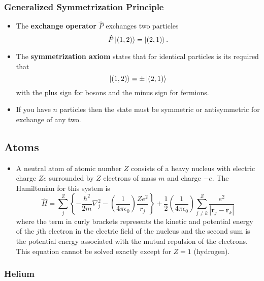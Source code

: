 \documentclass{article}
\renewcommand{\vec}[1]{\boldsymbol{\mathbf{#1}}}
\begin{document}
\subsubsection{Generalized Symmetrization Principle}

\begin{itemize}
  \item The \textbf{exchange operator} $\hat{P}$ exchanges two particles \[\hat{P} \ket{(1, 2)} = \ket{(2, 1)}.\]

  \item The \textbf{symmetrization axiom} states that for identical particles is its required that \[\ket{(1, 2)} = \pm \ket{(2, 1)}\] with the plus sign for bosons and the minus sign for fermions.

  \item If you have $n$ particles then the state must be symmetric or antisymmetric for exchange of any two.
\end{itemize}

\subsection{Atoms}

\begin{itemize}
  \item A neutral atom of atomic number $Z$ consists of a heavy nucleus with electric charge $Z e$ surrounded by $Z$ electrons of mass $m$ and charge $-e$. The Hamiltonian for this system is \[\hat{H} = \sum_j^Z \left\{ -\frac{\hbar^2}{2 m} \nabla_j^2 - \left( \frac{1}{4 \pi \epsilon_0} \right) \frac{Z e^2}{r_j} \right\} + \frac{1}{2} \left( \frac{1}{4 \pi \epsilon_0} \right) \sum_{j \ne k}^Z \frac{e^2}{|\vec{r}_j - \vec{r}_k|}\] where the term in curly brackets represents the kinetic and potential energy of the $j$th electron in the electric field of the nucleus and the second sum is the potential energy associated with the mutual repulsion of the electrons. This equation cannot be solved exactly except for $Z = 1$ (hydrogen).
\end{itemize}

\subsubsection{Helium}
\end{document}
